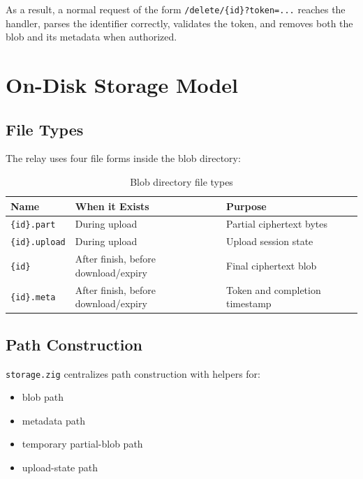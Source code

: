 \documentclass[11pt,a4paper]{report}
\begin{document}
As a result, a normal request of the form \texttt{/delete/\{id\}?token=...} reaches the handler, parses the identifier correctly, validates the token, and removes both the blob and its metadata when authorized.

\chapter{On-Disk Storage Model}

\section{File Types}

The relay uses four file forms inside the blob directory:

\begin{table}[H]
\centering
\begin{tabular}{lll}
\toprule
\textbf{Name} & \textbf{When it Exists} & \textbf{Purpose} \\
\midrule
\texttt{\{id\}.part} & During upload & Partial ciphertext bytes \\
\texttt{\{id\}.upload} & During upload & Upload session state \\
\texttt{\{id\}} & After finish, before download/expiry & Final ciphertext blob \\
\texttt{\{id\}.meta} & After finish, before download/expiry & Token and completion timestamp \\
\bottomrule
\end{tabular}
\caption{Blob directory file types}
\end{table}

\section{Path Construction}

\texttt{storage.zig} centralizes path construction with helpers for:

\begin{itemize}[leftmargin=1.5cm]
    \item blob path
    \item metadata path
    \item temporary partial-blob path
    \item upload-state path
\end{itemize}
\end{document}

